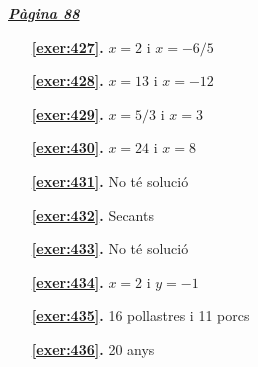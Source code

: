 
\hyperlink{page.88}{\textbf{\em Pàgina 88}}
\begin{enumerate}
\item[\fontfamily{phv}\selectfont\color{blue}\textbf{\ref{exer:427}. }] \label{ans:427} 
$x=2$ i $x=-6/5$
 \end{enumerate}
\begin{enumerate}
\item[\fontfamily{phv}\selectfont\color{blue}\textbf{\ref{exer:428}. }] \label{ans:428} 
$x=13$ i $x=-12$
\item[\fontfamily{phv}\selectfont\color{blue}\textbf{\ref{exer:429}. }] \label{ans:429} 
$x=5/3$ i $x=3$
\item[\fontfamily{phv}\selectfont\color{blue}\textbf{\ref{exer:430}. }] \label{ans:430} 
$x=24$ i $x=8$
\item[\fontfamily{phv}\selectfont\color{blue}\textbf{\ref{exer:431}. }] \label{ans:431} 
No té solució
\item[\fontfamily{phv}\selectfont\color{blue}\textbf{\ref{exer:432}. }] \label{ans:432} 
Secants
\item[\fontfamily{phv}\selectfont\color{blue}\textbf{\ref{exer:433}. }] \label{ans:433} 
No té solució
\item[\fontfamily{phv}\selectfont\color{blue}\textbf{\ref{exer:434}. }] \label{ans:434} 
$x=2$ i $y=-1$
\item[\fontfamily{phv}\selectfont\color{blue}\textbf{\ref{exer:435}. }] \label{ans:435} 
16 pollastres i 11 porcs
\item[\fontfamily{phv}\selectfont\color{blue}\textbf{\ref{exer:436}. }] \label{ans:436} 
20 anys
 \end{enumerate}

 \vspace{1cm} 
 

\vspace{0.3cm}


